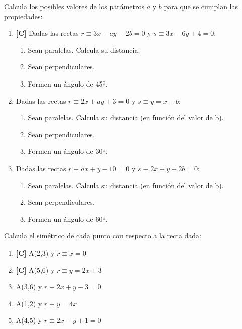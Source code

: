 \Exercicio Calcula los posibles valores de los parámetros $a$ y $b$ para que se cumplan las propiedades:
\begin{enumerate}[topsep=0pt]
	\item \textbf{[C]} Dadas las rectas $r \equiv 3x-ay -2b = 0$ y $s \equiv 3x-6y +4 = 0$:
	\begin{enumerate}[topsep=0pt]
		\item Sean paralelas. Calcula su distancia.
		\item Sean perpendiculares.
		\item Formen un ángulo de 45º.
	\end{enumerate}

	\item Dadas las rectas $r \equiv 2x + ay + 3 = 0$ y $s \equiv y = x - b$:
	\begin{enumerate}[topsep=0pt]
		\item Sean paralelas. Calcula su distancia (en función del valor de b).
		\item Sean perpendiculares.
		\item Formen un ángulo de 30º.
	\end{enumerate}

	\item Dadas las rectas $r \equiv ax + y - 10 = 0$ y $s \equiv 2x + y + 2b = 0$:
	\begin{enumerate}[topsep=0pt]
		\item Sean paralelas. Calcula su distancia (en función del valor de b).
		\item Sean perpendiculares.
		\item Formen un ángulo de 60º.
	\end{enumerate}

\end{enumerate}



\Exercicio Calcula el simétrico de cada punto con respecto a la recta dada:

\begin{enumerate}[topsep=0pt]
	\item \textbf{[C]} A(2,3) y $ r \equiv x = 0 $
	\item \textbf{[C]} A(5,6) y $ r \equiv y = 2x + 3 $
	
	\item A(3,6) y $ r \equiv 2x + y -3 = 0 $
	\item A(1,2) y $ r \equiv y = 4x $
	\item A(4,5) y $ r \equiv 2x - y + 1 = 0 $
\end{enumerate}


